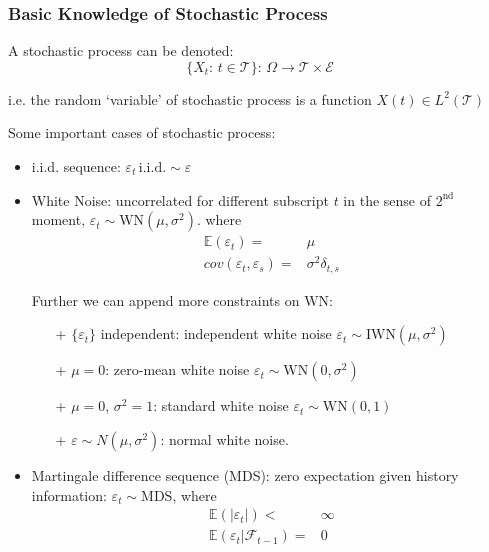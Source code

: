 \subsubsection{Basic Knowledge of Stochastic Process}
    A stochastic process can be denoted:
    \begin{equation}
        \{X_t:\,t\in \mathcal{T}\}:\, \Omega\to \mathcal{T}\times \mathcal{E}
    \end{equation}

    i.e. the random `variable' of stochastic process is a function $ X(t)\in L^2(\mathcal{T}) $
    
\begin{point}
    Some important cases of stochastic process:
\end{point}

    
    \begin{itemize}[topsep=2pt,itemsep=0pt]
        \item i.i.d. sequence: $ \varepsilon _t\,\mathrm{i.i.d.}\sim \varepsilon   $        
        \item White Noise: uncorrelated for different subscript $ t $ in the sense of $ 2^\mathrm{nd}  $ moment, $ \varepsilon _t\sim \mathrm{WN}(\mu ,\sigma ^2)  $. where
        \begin{align}
            \mathbb{E}\left( \varepsilon _t \right) =&\mu \\
            cov(\varepsilon _t,\varepsilon _s)=&\sigma ^2\delta _{t,s}
        \end{align}

        Further we can append more constraints on $ \mathrm{WN}  $:
        \begin{itemize}[topsep=2pt,itemsep=0pt]
            \item[+] $ \{\varepsilon _t\} $ independent: independent white noise $ \varepsilon _t\sim \mathrm{IWN}(\mu ,\sigma ^2)  $ 
            \item[+] $ \mu =0 $: zero-mean white noise $ \varepsilon _t\sim \mathrm{WN}(0 ,\sigma ^2)  $
            \item[+] $ \mu =0 $, $ \sigma ^2=1 $: standard white noise $ \varepsilon _t\sim \mathrm{WN}(0,1)  $
            \item[+] $ \varepsilon \sim N(\mu ,\sigma ^2) $: normal white noise.
        \end{itemize}
        \item Martingale difference sequence (MDS): zero expectation given history information: $ \varepsilon _t\sim \mathrm{MDS}  $, where
        \begin{align}
            \mathbb{E}\left( |\varepsilon _t| \right) <&\infty\\
            \mathbb{E}\left( \varepsilon _t|\mathcal{F}_{t-1} \right) =&0
        \end{align}


\end{itemize}

